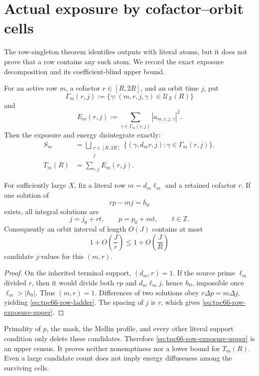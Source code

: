 \section{Actual exposure by cofactor--orbit cells}

The row-singleton theorem identifies outputs with literal atoms, but it does
not prove that a row contains any such atom. We record the exact exposure
decomposition and its coefficient-blind upper bound.

For an active row \(m\), a cofactor \(r\in[R,2R]\), and an orbit time \(j\),
put
\[
 \Gamma_m(r,j)
 :=\{\gamma:(m,r,j,\gamma)\in\mathcal U_X(R)\}
\]
and
\begin{equation}\label{eq:tpc66-cell-energy}
 E_m(r,j):=\sum_{\gamma\in\Gamma_m(r,j)}
 |a_{m,r,j,\gamma}|^2.
\end{equation}
Then the exposure and energy disintegrate exactly:
\begin{align}
 S_m
 &=\bigsqcup_{\substack{r\in[R,2R]\\j}}
   \{(\gamma,d_mr,j):\gamma\in\Gamma_m(r,j)\},
 \label{eq:tpc66-exposure-disintegration}\\
 T_m(R)&=\sum_{r,j}E_m(r,j).
 \label{eq:tpc66-energy-disintegration}
\end{align}

\begin{proposition}\label{prop:tpc66-row-spacing}
For sufficiently large \(X\), fix a literal row \(m=d_m\ell_m\) and a
retained cofactor \(r\). If one solution of
\[
 rp-mj=h_0
\]
exists, all integral solutions are
\begin{equation}\label{eq:tpc66-row-ladder}
 j=j_0+rt,\qquad p=p_0+mt,\qquad t\in\mathbb Z.
\end{equation}
Consequently an orbit interval of length \(O(J)\) contains at most
\begin{equation}\label{eq:tpc66-row-exposure-upper}
 1+O\!\left(\frac Jr\right)
 \le1+O\!\left(\frac JR\right)
\end{equation}
candidate \(j\)-values for this \((m,r)\).
\end{proposition}

\begin{proof}
On the inherited terminal support, \((d_m,r)=1\). If the source prime
\(\ell_m\) divided \(r\), then it would divide both \(rp\) and
\(d_m\ell_mj\), hence \(h_0\), impossible once
\(\ell_m>|h_0|\). Thus \((m,r)=1\). Differences of two solutions obey
\(r\Delta p=m\Delta j\), yielding \eqref{eq:tpc66-row-ladder}. The spacing
of \(j\) is \(r\), which gives \eqref{eq:tpc66-row-exposure-upper}.
\end{proof}

Primality of \(p\), the mask, the Mellin profile, and every other literal
support condition only delete these candidates. Therefore
\eqref{eq:tpc66-row-exposure-upper} is an upper census. It proves neither
nonemptiness nor a lower bound for \(T_m(R)\). Even a large candidate count
does not imply energy diffuseness among the surviving cells.
